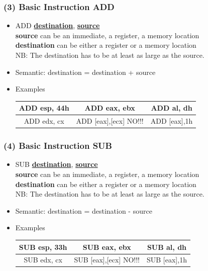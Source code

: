 \documentclass[]{beamer}
\begin{document}
\begin{frame}
  \frametitle{(3) Basic Instruction ADD}
  \begin{itemize}
  \item{ADD \underline{\textbf{destination}}, \underline{\textbf{source}}}\\
    \textbf{source} can be an immediate, a register, a memory location\\
    \textbf{destination} can be either a register or a memory location\\
    NB: The destination has to be at least as large as the source.

  \item{Semantic: destination = destination + source}
  \item{Examples}
    \begin{table}[h]
      \begin{tabular}{|c|c|c|}
        \hline
        ADD esp, 44h&ADD eax, ebx&ADD al, dh\\
        \hline
        ADD  edx, cx&ADD [eax],[ecx] \color{red}NO!!!&ADD [eax],1h\\
        \hline
      \end{tabular}
    \end{table}

  \end{itemize}
\end{frame}
\begin{frame}
  \frametitle{(4) Basic Instruction SUB}
  \begin{itemize}
  \item{SUB \underline{\textbf{destination}}, \underline{\textbf{source}}}\\
    \textbf{source} can be an immediate, a register, a memory location\\
    \textbf{destination} can be either a register or a memory location\\
    NB: The destination has to be at least as large as the source.
  \item{Semantic: destination = destination - source}

  \item{Examples}
    \begin{table}[h]
      \begin{tabular}{|c|c|c|}
        \hline
        SUB esp, 33h&SUB eax, ebx&SUB al, dh\\
        \hline
        SUB edx, cx&SUB [eax],[ecx] \color{red}NO!!!&SUB [eax],1h\\
        \hline
      \end{tabular}
    \end{table}

  \end{itemize}
\end{frame}
\end{document}
